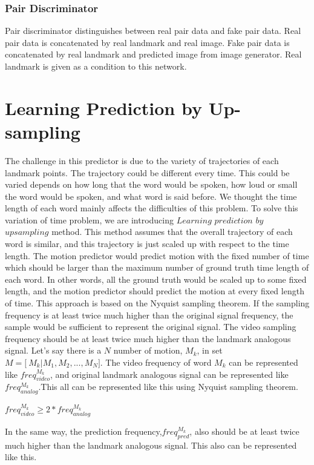\documentclass[10pt,twocolumn,letterpaper]{article}
\begin{document}
\subsubsection{Pair Discriminator}
Pair discriminator distinguishes between real pair data and fake pair data. Real pair data is concatenated by real landmark and real image. Fake pair data is concatenated by real landmark and predicted image from image generator. Real landmark is given as a condition to this network.
\section{Learning Prediction by Up-sampling}
The challenge in this predictor is due to the variety of trajectories of each landmark points. The trajectory could be different every time. This could be varied depends on how long that the word would be spoken, how loud or small the word would be spoken, and what word is said before. We thought the time length of each word mainly affects the difficulties of this problem.
To solve this variation of time problem, we are introducing $Learning$ $ prediction$ $by$ $upsampling$ method. This method assumes that the overall trajectory of each word is similar, and this trajectory is just scaled up with respect to the time length. The motion predictor would predict motion with the fixed number of time which should be larger than the maximum number of ground truth time length of each word. In other words, all the ground truth would be scaled up to some fixed length, and the motion predictor should predict the motion at every fixed length of time.
This approach is based on the Nyquist sampling theorem. If the sampling frequency is at least twice much higher than the original signal frequency, the sample would be sufficient to represent the original signal. The video sampling frequency should be at least twice much higher than the landmark analogous signal. Let's say there is a $N$ number of motion, $M_k$, in set $M = \big[\ M_k|M_1,M_2, ... , M_N\big]$. The video frequency of word $M_k$ can be represented like  $freq_{video}^{M_k}$, and original landmark analogous signal can be represented like $freq_{analog}^{M_k}$.This all can be represented like this using Nyquist sampling theorem.

\bigskip
\begin{center}
$freq_{video}^{M_k} \geq 2 \ast freq_{analog}^{M_k} $
\end{center}
\bigskip

In the same way, the prediction frequency,$freq_{pred}^{M_k}$, also should be at least twice much higher than the landmark analogous signal. This also can be represented like this.
\end{document}
